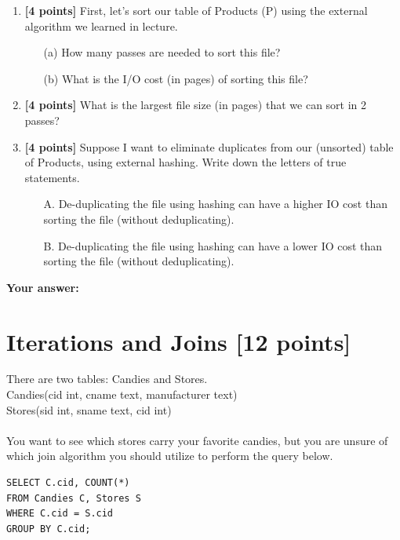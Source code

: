 \documentclass[10pt]{article}
\begin{document}
\begin{enumerate}
	\item \textbf{[4 points]}
	      First, let’s sort our table of Products (P) using the external algorithm we learned in lecture.
	      \begin{itemize}
		      \item[(a)] How many passes are needed to sort this file?
		      \item[(b)] What is the I/O cost (in pages) of sorting this file?
	      \end{itemize}
	\item \textbf{[4 points]}
	      What is the largest file size (in pages) that we can sort in 2 passes?\\
	\item \textbf{[4 points]}
	      Suppose I want to eliminate duplicates from our (unsorted) table of Products,
	      using external hashing. Write down the letters of true statements.
	      \begin{itemize}
		      \item[A.] De-duplicating the file using hashing can have a higher IO cost than sorting the file (without deduplicating).
		      \item[B.] De-duplicating the file using hashing can have a lower IO cost than sorting the file (without deduplicating).
	      \end{itemize}
\end{enumerate}
\textbf{Your answer:}



\newpage
\section{Iterations and Joins \textbf{[12 points]}}
There are two tables: Candies and Stores. \\

Candies(cid int, cname text, manufacturer text) \\

Stores(sid int, sname text, cid int) \\
\\
You want to see which stores carry your favorite candies, but you are unsure of which join
algorithm you should utilize to perform the query below.
\begin{verbatim}
SELECT C.cid, COUNT(*)
FROM Candies C, Stores S
WHERE C.cid = S.cid
GROUP BY C.cid;
\end{verbatim}
\end{document}

